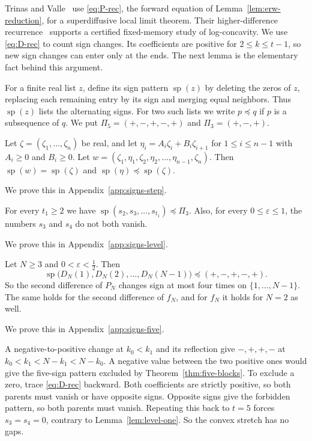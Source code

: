 Trinas and Valle~\cite[(2.2)]{tv2026} use \eqref{eq:P-rec}, the forward
equation of Lemma~\ref{lem:erw-reduction}, for a superdiffusive local
limit theorem. Their higher-difference recurrence~\cite[(4.10)]{tv2026}
supports a certified fixed-memory study of log-concavity. We use \eqref{eq:D-rec} to count sign changes. Its coefficients are
positive for $2\le k\le t-1$, so new sign changes can enter only at
the ends. The next lemma is the elementary fact behind this argument.

For a finite real list $z$, define its sign pattern
$\operatorname{sp}(z)$ by deleting the zeros of $z$, replacing each
remaining entry by its sign and merging equal neighbors. Thus
$\operatorname{sp}(z)$ lists the alternating signs. For
two such lists we write $p\preceq q$ if $p$ is a subsequence of $q$. We put
$\Pi_5=(+,-,+,-,+)$ and $\Pi_3=(+,-,+)$.

\begin{lemma}\label{lem:interleave}
Let $\zeta=(\zeta_1,\dots,\zeta_n)$ be real, and let
$\eta_i=A_i\zeta_i+B_i\zeta_{i+1}$ for $1\le i\le n-1$ with $A_i\ge0$ and
$B_i\ge0$. Let $w=(\zeta_1,\eta_1,\zeta_2,\eta_2,\dots,\eta_{n-1},\zeta_n)$.
Then $\operatorname{sp}(w)=\operatorname{sp}(\zeta)$ and
$\operatorname{sp}(\eta)\preceq\operatorname{sp}(\zeta)$.
\end{lemma}

We prove this in Appendix~\ref{app:signs-step}.

\begin{lemma}\label{lem:level-one}
For every $t_1\ge2$ we have $\operatorname{sp}(s_2,s_3,\dots,s_{t_1})\preceq\Pi_3$.
Also, for every $0\le\varepsilon\le1$, the numbers $s_3$ and $s_4$ do not both vanish.
\end{lemma}

We prove this in Appendix~\ref{app:signs-level}.

\begin{theorem}\label{thm:five-blocks}
Let $N\ge3$ and $0<\varepsilon<\frac12$. Then
\[
 \operatorname{sp}\bigl(D_N(1),D_N(2),\dots,D_N(N-1)\bigr)\preceq(+,-,+,-,+).
\]
So the second difference of $P_N$ changes sign at most four times on
$\{1,\dots,N-1\}$. The same holds for the second difference of $f_N$, and for
$f_N$ it holds for $N=2$ as well.
\end{theorem}

We prove this in Appendix~\ref{app:signs-five}.

A negative-to-positive change at $k_0<k_1$ and its reflection give
$-,+,+,-$ at $k_0<k_1<N-k_1<N-k_0$. A negative value between
the two positive ones would give the five-sign pattern excluded by
Theorem~\ref{thm:five-blocks}. To exclude a zero, trace
\eqref{eq:D-rec} backward. Both coefficients are strictly positive,
so both parents must vanish or have opposite signs. Opposite signs give the
forbidden pattern, so both parents must vanish. Repeating this back
to $t=5$ forces $s_3=s_4=0$,
contrary to Lemma~\ref{lem:level-one}. So the convex stretch has no gaps.

